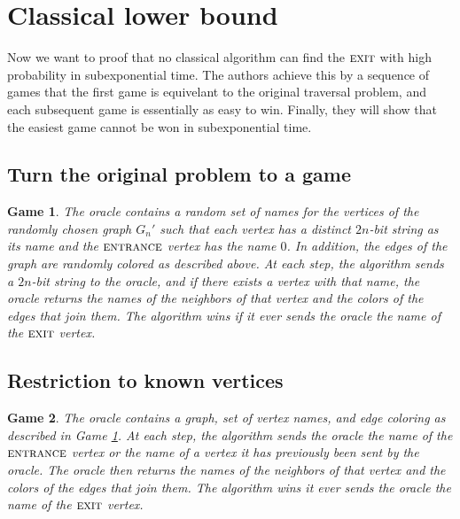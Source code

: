 \documentclass[aps,11pt,twoside,nofootinbib,tightenlines,superscriptaddress,preprintnumbers]{revtex4}
\newcommand{\<}{\langle}
\renewcommand{\>}{\rangle}
\newcommand{\ent}{{\textsc{entrance}}}
\newcommand{\exit}{{\textsc{exit}}}
\newtheorem{game}{Game}
\newenvironment{proof sketch}
{\trivlist\item\noindent{\bf Proof sketch}~}
{\qed\endtrivlist}
\begin{document}

\section{Classical lower bound}\label{sec:lowerbound}

Now we want to proof that no classical algorithm can find the $\exit$ with high
probability in subexponential time. The authors achieve this by a sequence of games that the first game is equivelant to the original traversal problem, and each subsequent game is essentially as easy to win. Finally, they will show that the easiest game cannot be won in subexponential time.

\subsection{Turn the original problem to a game}

\begin{game}\label{game:original}
  The oracle contains a random set of names for the vertices of the
  randomly chosen graph $G_n'$ such that each vertex has a distinct
  $2n$-bit string as its name and the $\ent$ vertex has the name $0$.  In
  addition, the edges of the graph are randomly colored as described
  above.
%
  At each step, the algorithm sends a $2n$-bit string to the oracle, and
  if there exists a vertex with that name, the oracle returns the names of
  the neighbors of that vertex and the colors of the edges that join
  them.
%
  The algorithm wins if it ever sends the oracle the name of the $\exit$
  vertex.
\end{game}

\subsection{Restriction to known vertices}


\begin{game}\label{game:tree}
  The oracle contains a graph, set of vertex names, and edge coloring as
  described in Game \ref{game:original}.
%
  At each step, the algorithm sends the oracle the name of the $\ent$
  vertex or the name of a vertex it has previously been sent by the
  oracle.  The oracle then returns the names of the neighbors of that
  vertex and the colors of the edges that join them.
%
  The algorithm wins it ever sends the oracle the name of the $\exit$
  vertex.
\end{game}
\end{document}
